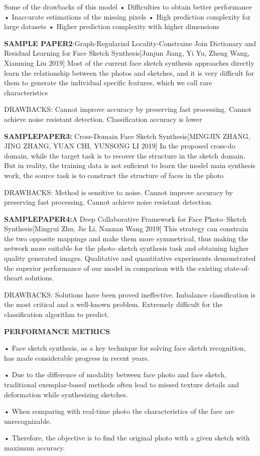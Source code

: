 \documentclass[journal]{IEEEtran} %
\begin{document}
{Some of the drawbacks of this model } 
•	Difficulties to obtain better performance 
•	Inaccurate estimations of the missing pixels 
•	High prediction complexity for large datasets 
•	Higher prediction complexity with higher dimensions 

\textbf{SAMPLE PAPER2}:Graph-Regularizd Locality-Constraine Join  Dictionary and Residual Learning for Face Sketch Synthesis[Junjun Jiang, Yi Yu, Zheng Wang, Xianming Liu
2019]
Most of the current face sketch synthesis approaches directly learn the relationship between the photos and sketches, and it is very difficult for them to generate the individual specific features, which we call rare characteristics

{DRAWBACKS:}
Cannot improve accuracy by preserving fast processing.
Cannot achieve noise resistant detection.
Classification accuracy is lower

\textbf{SAMPLEPAPER3: }Cross-Domain Face Sketch Synthesis[MINGJIN ZHANG, JING ZHANG, YUAN CHI, YUNSONG LI 2019]
In the proposed cross-do domain, while the target task is to recover the structure in the sketch domain. But in reality, the training data is not suficient to learn the model main synthesis work, the source task is to construct the structure of faces in the photo

{DRAWBACKS:}
Method is sensitive to noise.
Cannot improve accuracy by preserving fast processing.
Cannot achieve noise resistant detection.

\textbf{SAMPLEPAPER4:}A Deep Collaborative Framework for Face Photo–Sketch Synthesis[Mingrui Zhu, Jie Li, Nannan Wang 2019]
This strategy can constrain the two opposite mappings and make them more symmetrical, thus making the network more suitable for the photo–sketch synthesis task and obtaining higher quality generated images. Qualitative and quantitative experiments demonstrated the superior performance of our model in comparison with the existing state-of-theart solutions.

{DRAWBACKS:}
Solutions have been proved ineffective.
Imbalance classification is the most critical and a well-known problem.
Extremely difficult for the classification algorithm to predict.

\textbf{PERFORMANCE METRICS}

•	Face sketch synthesis, as a key technique for solving face sketch recognition, has made considerable progress in recent years. 

•	Due to the difference of modality between face photo and face sketch, traditional exemplar-based methods often lead to missed texture details and deformation while synthesizing sketches. 

•	When comparing with real-time photo the characteristics of the face are unrecognizable.

•	Therefore, the objective is to find the original photo with a given sketch with maximum accuracy.
\end{document}
